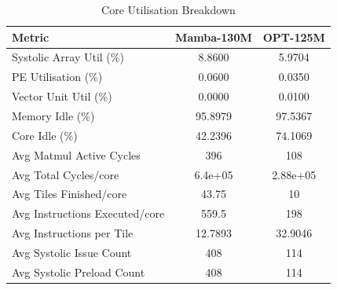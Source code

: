\begin{table}[h]\centering
    \caption{Core Utilisation Breakdown}
    \label{tab:core_utilisation}
    \begin{tabular}{lcc}\hline
    Metric & Mamba-130M & OPT-125M \\\hline
        Systolic Array Util (\%) & 8.8600 & 5.9704 \\
    PE Utilisation (\%) & 0.0600 & 0.0350 \\
    Vector Unit Util (\%) & 0.0000 & 0.0100 \\
    Memory Idle (\%) & 95.8979 & 97.5367 \\
    Core Idle (\%) & 42.2396 & 74.1069 \\
    Avg Matmul Active Cycles & 396 & 108 \\
    Avg Total Cycles/core & 6.4e+05 & 2.88e+05 \\
    Avg Tiles Finished/core & 43.75 & 10 \\
    Avg Instructions Executed/core & 559.5 & 198 \\
    Avg Instructions per Tile & 12.7893 & 32.9046 \\
    Avg Systolic Issue Count & 408 & 114 \\
    Avg Systolic Preload Count & 408 & 114 \\
\hline\end{tabular}\end{table}
